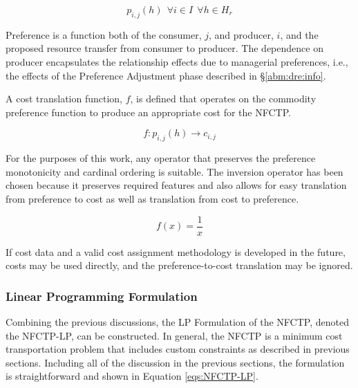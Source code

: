 \begin{equation}
p_{i, j}(h) \:\: \forall i \in I  \:\: \forall h \in H_{r} 
\end{equation}

Preference is a function both of the consumer, $j$, and producer, $i$, and the
proposed resource transfer from consumer to producer. The dependence on producer
encapsulates the relationship effects due to managerial preferences, i.e., the
effects of the Preference Adjustment phase described in \S \ref{abm:dre:info}.

A cost translation function, $f$, is defined that operates on the commodity
preference function to produce an appropriate cost for the NFCTP.

\begin{equation}
f : p_{i,j}(h) \to c_{i,j}
\end{equation}

For the purposes of this work, any operator that preserves the preference
monotonicity and cardinal ordering is suitable.  The inversion operator has been
chosen because it preserves required features and also allows for easy
translation from preference to cost as well as translation from cost to
preference.

\begin{equation}
f(x) = \frac{1}{x}
\end{equation}

If cost data and a valid cost assignment methodology is developed in the future,
costs may be used directly, and the preference-to-cost translation may be
ignored.

\subsubsection{Linear Programming Formulation}\label{abm:dre:lp}

Combining the previous discussions, the LP Formulation of the NFCTP, denoted the
NFCTP-LP, can be constructed. In general, the NFCTP is a minimum cost
transportation problem that includes custom constraints as described in previous
sections. Including all of the discussion in the previous sections, the
formulation is straightforward and shown in Equation \ref{eqs:NFCTP-LP}.

